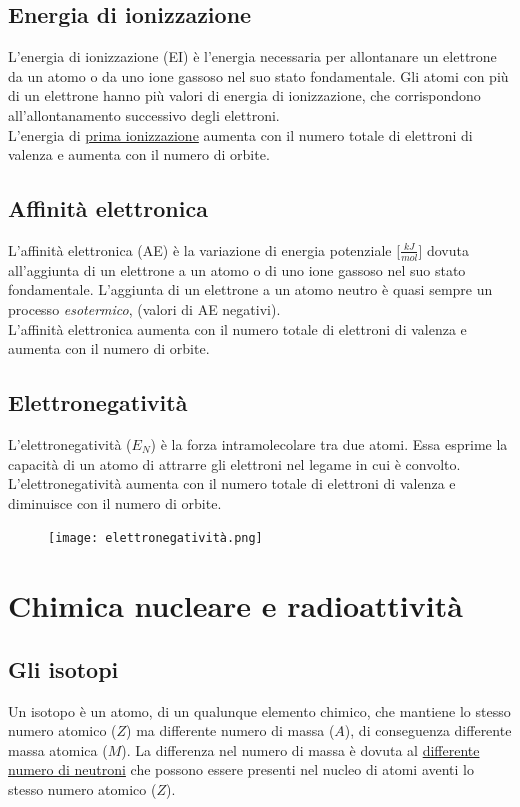 \documentclass{article}
\begin{document}
\subsection{Energia di ionizzazione}
L'energia di ionizzazione (EI) è l'energia necessaria per allontanare un elettrone da un atomo o da
uno ione gassoso nel suo stato fondamentale. Gli atomi con più di un elettrone hanno più valori
di energia di ionizzazione, che corrispondono all'allontanamento successivo degli elettroni.\\
L'energia di \underline{prima ionizzazione} aumenta con il numero totale di elettroni di valenza
e aumenta con il numero di orbite.

\subsection{Affinità elettronica}
L'affinità elettronica (AE) è la variazione di energia potenziale [$\frac{kJ}{mol}$] dovuta
all'aggiunta di un elettrone a un atomo o di uno ione gassoso nel suo stato fondamentale.
L'aggiunta di un elettrone a un atomo neutro è quasi sempre un processo \textit{esotermico},
(valori di AE negativi).\\
L'affinità elettronica aumenta con il numero totale di elettroni di valenza e aumenta
con il numero di orbite.

\hypertarget{elettronegatività}{}
\subsection{Elettronegatività}
L'elettronegatività ($E_N$) è la forza intramolecolare tra due atomi.
Essa esprime la capacità di un atomo di attrarre gli elettroni nel legame in cui è convolto.\\
L'elettronegatività aumenta con il numero totale di elettroni di valenza e diminuisce
con il numero di orbite.
\begin{figure}[h!]
    \centering \texttt{[image: elettronegatività.png]}
\end{figure}

\pagebreak

\section{Chimica nucleare e radioattività}
\subsection{Gli isotopi}
Un isotopo è un atomo, di un qualunque elemento chimico, che mantiene lo stesso numero atomico ($Z$)
ma differente numero di massa ($A$), di conseguenza differente massa atomica ($M$).
La differenza nel numero di massa è dovuta al \underline{differente numero di neutroni} che possono
essere presenti nel nucleo di atomi aventi lo stesso numero atomico ($Z$).
\end{document}
